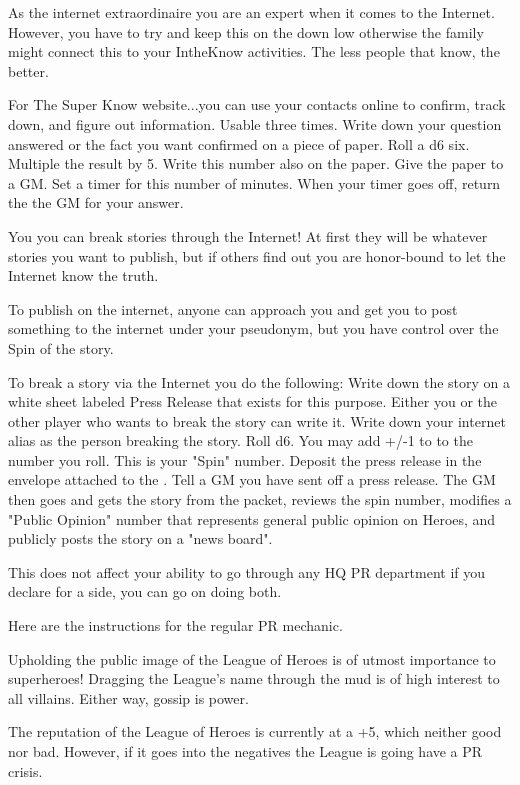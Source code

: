 \documentclass[green]{LRSguildcamp1}
\begin{document}
\name{\gInternetPR{}}

As \cTween{} the internet extraordinaire you are an expert when it comes to the Internet. However, you have to try and keep this on the down low otherwise the family might connect this to your IntheKnow activities. The less people that know, the better. 

For The Super Know website...you can use your contacts online to confirm, track down, and figure out information.  Usable three times. Write down your question answered or the fact you want confirmed on a piece of paper. Roll a d6 six. Multiple the result by 5. Write this number also on the paper. Give the paper to a GM. Set a timer for this number of minutes. When your timer goes off, return the the GM for your answer. 

You you can break stories through the Internet! At first they will be whatever stories you want to publish, but if others find out you are honor-bound to let the Internet know the truth.

To publish on the internet, anyone can approach you and get you to post something to the internet under your pseudonym, but you have control over the Spin of the story. 

To break a story via the Internet you do the following:
Write down the story on a white sheet labeled Press Release that exists for this purpose. Either you or the other player who wants to break the story can write it. 
Write down your internet alias as the person breaking the story.  
Roll d6.  You may add +/-1 to to the number you roll. This is your "Spin" number.
Deposit the press release in the envelope attached to the \sComputer{}. 
Tell a GM you have sent off a press release.
The GM then goes and gets the story from the packet, reviews the spin number, modifies a "Public Opinion" number that represents general public opinion on Heroes, and publicly posts the story on a "news board". 

This does not affect your ability to go through any HQ PR department if you declare for a side, you can go on doing both. 


Here are the instructions for the regular PR mechanic. 

Upholding the public image of the League of Heroes is of utmost importance to superheroes! 
Dragging the League's name through the mud is of high interest to all villains. Either way, gossip is power. 

The reputation of the League of Heroes is currently at a +5, which neither good nor bad. However, if it goes into the negatives the League is going have a PR crisis. 
\end{document}
